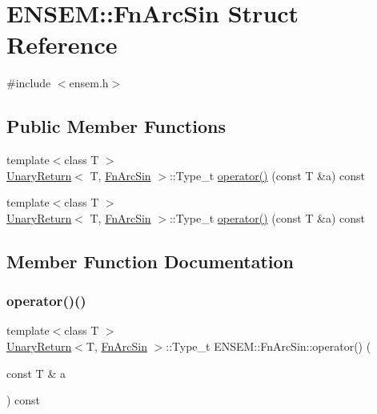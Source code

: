 \hypertarget{structENSEM_1_1FnArcSin}{}\section{E\+N\+S\+EM\+:\+:Fn\+Arc\+Sin Struct Reference}
\label{structENSEM_1_1FnArcSin}


{\ttfamily \#include $<$ensem.\+h$>$}

\subsection*{Public Member Functions}
\begin{DoxyCompactItemize}
\item 
{\footnotesize template$<$class T $>$ }\\\mbox{\hyperlink{structENSEM_1_1UnaryReturn}{Unary\+Return}}$<$ T, \mbox{\hyperlink{structENSEM_1_1FnArcSin}{Fn\+Arc\+Sin}} $>$\+::Type\+\_\+t \mbox{\hyperlink{structENSEM_1_1FnArcSin_a2b5019522f59b30d6320947daae37df8}{operator()}} (const T \&a) const
\item 
{\footnotesize template$<$class T $>$ }\\\mbox{\hyperlink{structENSEM_1_1UnaryReturn}{Unary\+Return}}$<$ T, \mbox{\hyperlink{structENSEM_1_1FnArcSin}{Fn\+Arc\+Sin}} $>$\+::Type\+\_\+t \mbox{\hyperlink{structENSEM_1_1FnArcSin_a2b5019522f59b30d6320947daae37df8}{operator()}} (const T \&a) const
\end{DoxyCompactItemize}


\subsection{Member Function Documentation}
\mbox{\label{structENSEM_1_1FnArcSin_a2b5019522f59b30d6320947daae37df8}} 
\subsubsection{\texorpdfstring{operator()()}{operator()()}\hspace{0.1cm}{\footnotesize\ttfamily [1/2]}}
{\footnotesize\ttfamily template$<$class T $>$ \\
\mbox{\hyperlink{structENSEM_1_1UnaryReturn}{Unary\+Return}}$<$T, \mbox{\hyperlink{structENSEM_1_1FnArcSin}{Fn\+Arc\+Sin}} $>$\+::Type\+\_\+t E\+N\+S\+E\+M\+::\+Fn\+Arc\+Sin\+::operator() (\begin{DoxyParamCaption}\item[{const T \&}]{a }\end{DoxyParamCaption}) const\hspace{0.3cm}{\ttfamily [inline]}}

